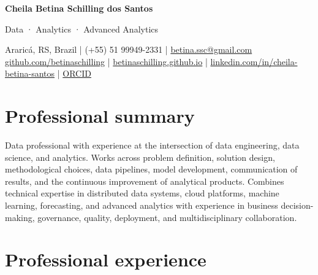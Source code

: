 \documentclass[10pt,a4paper]{article}
\begin{document}
{\sffamily
{\fontsize{24}{27}\selectfont\bfseries Cheila Betina Schilling dos Santos}\par
\vspace{3pt}
{\large\color{red} Data · Analytics · Advanced Analytics}\par
\vspace{5pt}
{\small
Araricá, RS, Brazil \quad | \quad (+55) 51 99949-2331 \quad | \quad
\href{mailto:betina.ssc@gmail.com}{betina.ssc@gmail.com}\\
\href{https://github.com/betinaschilling}{github.com/betinaschilling} \quad | \quad
\href{https://betinaschilling.github.io/}{betinaschilling.github.io} \quad | \quad
\href{https://www.linkedin.com/in/cheila-betina-santos/}{linkedin.com/in/cheila-betina-santos} \quad | \quad
\href{https://orcid.org/0009-0008-6145-3587}{ORCID}
}\par
}

\section{Professional summary}

Data professional with experience at the intersection of data engineering, data science, and analytics. Works across problem definition, solution design, methodological choices, data pipelines, model development, communication of results, and the continuous improvement of analytical products. Combines technical expertise in distributed data systems, cloud platforms, machine learning, forecasting, and advanced analytics with experience in business decision-making, governance, quality, deployment, and multidisciplinary collaboration.

\section{Professional experience}
\end{document}
